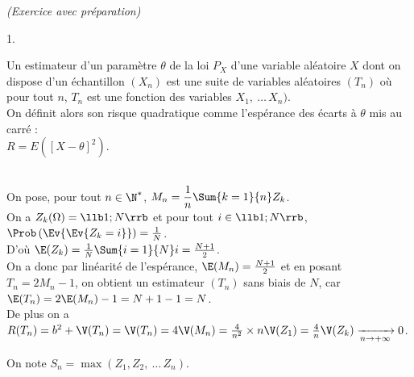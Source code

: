 \documentclass[11pt]{article}%
\begin{document}
 \begin{exercice}{\it (Exercice avec préparation)}~
 \begin{noliste}{1.}
 \setlength{\itemsep}{4mm}
 \item Un estimateur d'un paramètre $\theta$ de la loi $P_{X}$ d'une
variable aléatoire $X$ dont on dispose d'un échantillon $(X_{n})$ est
une suite de variables aléatoires $(T_{n})$ où pour tout $n$, $T_{n}$
est une fonction des variables $X_{1},\ \dots\, X_{n})$. \\
 On définit alors son risque quadratique comme l'espérance des écarts à
$\theta$ mis au carré : \\
$R = E ( [X - \theta]^{2})$. \\
\\
 \item On pose, pour tout $n \in \N^*$, $M_{n} = \dfrac{1}{n} \Sum{k =
1}{n} Z_{k}$. \\
 On a $Z_{k} (\Omega) = \llb 1 ; N \rrb$ et pour tout $i \in \llb 1 ; N
\rrb$, $\Prob\left(\Ev{\Ev{Z_{k} = i}}\right) = \frac{1}{N}$. \\
 D'où $\E(Z_{k}) = \frac{1}{N} \Sum{i = 1}{N} i = \frac{N + 1}{2}$. \\
 On a donc par linéarité de l'espérance, $\E(M_{n}) = \frac{N + 1}{2}$
et en posant $T_{n} = 2 M_{n} -1$, on obtient un estimateur $(T_{n})$
sans biais de $N$, car $\E(T_{n}) = 2 \E(M_{n}) - 1 = N + 1 - 1 = N$.
\\
 De plus on a $R(T_{n}) = b^{2} + \V(T_{n}) = \V(T_{n}) = 4 \V(M_{n}) =
\frac{4}{n^{2}} \times n \V(Z_{1}) = \frac{4}{n} \V(Z_{k})
\xrightarrow[n \rightarrow + \infty]{} 0$. \\
 \item On note $S_{n} = \max ( Z_{1}, Z_{2},\ \dots\, Z_{n})$.
\end{noliste}
\end{exercice}
\end{document}
